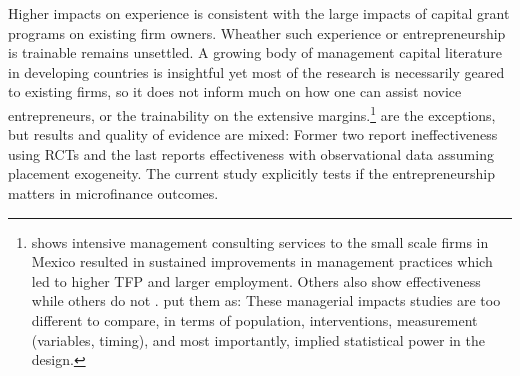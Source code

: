 	Higher impacts on experience is consistent with the large impacts of capital grant programs on existing firm owners. Wheather such experience or entrepreneurship is trainable remains unsettled. A growing body of management capital literature in developing countries is insightful yet most of the research is necessarily geared to existing firms, so it does not inform much on how one can assist novice entrepreneurs, or the trainability on the extensive margins.\footnote{\citet{BruhnKarlanSchoar2018} shows intensive management consulting services to the small scale firms in Mexico resulted in sustained improvements in management practices which led to higher TFP and larger employment. Others also show effectiveness \citep{Calderon2011, Berge2012, Bloometal2013} while others do not \citep{Bruhn2012, KarlanKnightUdry2015}. \citet{MckenzieWoodruff2013} put them as: These managerial impacts studies are too different to compare, in terms of population, interventions, measurement (variables, timing), and most importantly, implied statistical power in the design. } \citet{KarlanValvidia2011, BruhnZia2011, Argent2014} are the exceptions, but results and quality of evidence are mixed: Former two report ineffectiveness using RCTs and the last reports effectiveness with observational data assuming placement exogeneity.  The current study explicitly tests if the entrepreneurship matters in microfinance outcomes. %

